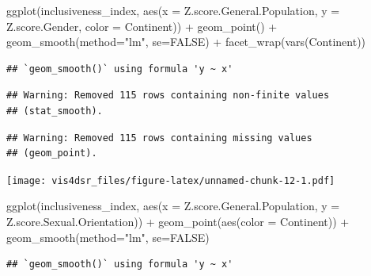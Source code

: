 \documentclass[
]{krantz}
\makeatletter
\newenvironment{Shaded}{\begin{snugshade}}{\end{snugshade}}
\newcommand{\AttributeTok}[1]{\textcolor[rgb]{0.61,0.61,0.61}{#1}}
\newcommand{\ConstantTok}[1]{\textcolor[rgb]{0,0,0}{#1}}
\newcommand{\FunctionTok}[1]{\textcolor[rgb]{0,0,0}{#1}}
\newcommand{\NormalTok}[1]{#1}
\newcommand{\SpecialCharTok}[1]{\textcolor[rgb]{0,0,0}{#1}}
\newcommand{\StringTok}[1]{\textcolor[rgb]{0.5,0.5,0.5}{#1}}
\newenvironment{kframe}{%
\medskip{}
\setlength{\fboxsep}{.8em}
 \def\at@end@of@kframe{}%
 \ifinner\ifhmode%
  \def\at@end@of@kframe{\end{minipage}}%
  \begin{minipage}{\columnwidth}%
 \fi\fi%
 \def\FrameCommand##1{\hskip\@totalleftmargin \hskip-\fboxsep
 \colorbox{shadecolor}{##1}\hskip-\fboxsep
     \hskip-\linewidth \hskip-\@totalleftmargin \hskip\columnwidth}%
 \MakeFramed {\advance\hsize-\width
   \@totalleftmargin\z@ \linewidth\hsize
   \@setminipage}}%
 {\par\unskip\endMakeFramed%
 \at@end@of@kframe}
\renewenvironment{Shaded}{\begin{kframe}}{\end{kframe}}
\makeatother
\begin{document}
\begin{Shaded}
\begin{Highlighting}[]
\FunctionTok{ggplot}\NormalTok{(inclusiveness\_index, }
       \FunctionTok{aes}\NormalTok{(}\AttributeTok{x =}\NormalTok{ Z.score.General.Population, }
           \AttributeTok{y =}\NormalTok{ Z.score.Gender,}
           \AttributeTok{color =}\NormalTok{ Continent)) }\SpecialCharTok{+}
  \FunctionTok{geom\_point}\NormalTok{() }\SpecialCharTok{+}
  \FunctionTok{geom\_smooth}\NormalTok{(}\AttributeTok{method=}\StringTok{"lm"}\NormalTok{, }\AttributeTok{se=}\ConstantTok{FALSE}\NormalTok{) }\SpecialCharTok{+} 
  \FunctionTok{facet\_wrap}\NormalTok{(}\FunctionTok{vars}\NormalTok{(Continent))}
\end{Highlighting}
\end{Shaded}

\begin{verbatim}
## `geom_smooth()` using formula 'y ~ x'
\end{verbatim}

\begin{verbatim}
## Warning: Removed 115 rows containing non-finite values
## (stat_smooth).
\end{verbatim}

\begin{verbatim}
## Warning: Removed 115 rows containing missing values
## (geom_point).
\end{verbatim}

\texttt{[image: vis4dsr\_files/figure-latex/unnamed-chunk-12-1.pdf]}

\begin{Shaded}
\begin{Highlighting}[]
\FunctionTok{ggplot}\NormalTok{(inclusiveness\_index, }
       \FunctionTok{aes}\NormalTok{(}\AttributeTok{x =}\NormalTok{ Z.score.General.Population, }
           \AttributeTok{y =}\NormalTok{ Z.score.Sexual.Orientation)) }\SpecialCharTok{+}
  \FunctionTok{geom\_point}\NormalTok{(}\FunctionTok{aes}\NormalTok{(}\AttributeTok{color =}\NormalTok{ Continent)) }\SpecialCharTok{+}
  \FunctionTok{geom\_smooth}\NormalTok{(}\AttributeTok{method=}\StringTok{"lm"}\NormalTok{, }\AttributeTok{se=}\ConstantTok{FALSE}\NormalTok{)}
\end{Highlighting}
\end{Shaded}

\begin{verbatim}
## `geom_smooth()` using formula 'y ~ x'
\end{verbatim}
\end{document}
